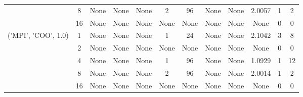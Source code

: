 \begin{tabular}{cccccccccccc}
& 8& None& None& None& 2& 96& None& None& 2.0057& 1& 2\\
& 16& None& None& None& None& None& None& None& None& 0& 0\\
\hline
\multirow{5}{*}{('MPI', 'COO', 1.0)}& 1& None& None& None& 1& 24& None& None& 2.1042& 3& 8\\
& 2& None& None& None& None& None& None& None& None& 0& 0\\
& 4& None& None& None& 1& 96& None& None& 1.0929& 1& 12\\
& 8& None& None& None& 2& 96& None& None& 2.0014& 1& 2\\
& 16& None& None& None& None& None& None& None& None& 0& 0\\
\hline
\end{tabular}



